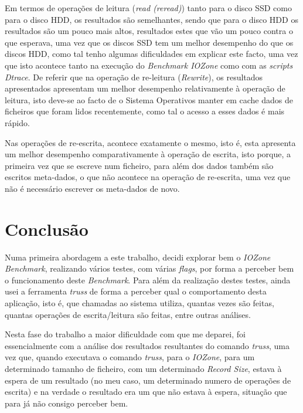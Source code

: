 \documentclass[conference,compsoc]{IEEEtran}
\begin{document}
Em termos de operações de leitura (\textit{read (reread)}) tanto para o disco SSD como para o disco HDD, os resultados são semelhantes, sendo que para o disco HDD os resultados são um pouco mais altos, resultados estes que vão um pouco contra o que esperava, uma vez que os discos SSD tem um melhor desempenho do que os discos HDD, como tal tenho algumas dificuldades em explicar este facto, uma vez que isto acontece tanto na execução do \textit{Benchmark IOZone} como com as \textit{scripts Dtrace}. De referir que na operação de re-leitura (\textit{Rewrite}), os resultados apresentados apresentam um melhor desempenho relativamente à operação de leitura, isto deve-se ao facto de o Sistema Operativos manter em cache dados de ficheiros que foram lidos recentemente, como tal o acesso a esses dados é mais rápido. 

Nas operações de re-escrita, acontece exatamente o mesmo, isto é, esta apresenta um melhor desempenho comparativamente à operação de escrita, isto porque, a primeira vez que se escreve num ficheiro, para além dos dados também são escritos meta-dados, o que não acontece na operação de re-escrita, uma vez que não é necessário escrever os meta-dados de novo.


\section{Conclusão}
Numa primeira abordagem a este trabalho, decidi explorar bem o \textit{IOZone Benchmark}, realizando vários testes, com várias \textit{flags}, por forma a perceber bem o funcionamento deste \textit{Benchmark}. Para além da realização destes testes, ainda usei a ferramenta \textit{truss} de forma a perceber qual o comportamento desta aplicação, isto é, que chamadas ao sistema utiliza, quantas vezes são feitas, quantas operações de escrita/leitura são feitas, entre outras análises.

Nesta fase do trabalho a maior dificuldade com que me deparei, foi essencialmente com a análise dos resultados resultantes do comando \textit{truss}, uma vez que, quando executava o comando \textit{truss}, para o \textit{IOZone}, para um determinado tamanho de ficheiro, com um determinado \textit{Record Size}, estava à espera de um resultado (no meu caso, um determinado numero de operações de escrita) e na verdade o resultado era um que não estava à espera, situação que para já não consigo perceber bem.
\end{document}
